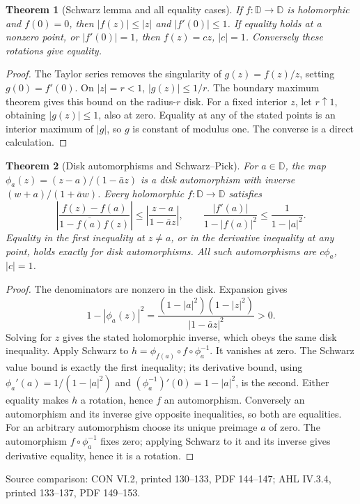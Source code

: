 \documentclass[11pt,a4paper,openany]{book}
\newtheorem{theorem}{Theorem}[chapter]
\theoremstyle{definition}
\theoremstyle{remark}\newtheorem{remark}[theorem]{Remark}
\newcommand{\D}{\mathbb D}\newcommand{\Chat}{\widehat{\mathbb C}}
\newcommand{\family}[1]{}
\newcommand{\source}[1]{\par\begingroup\small\sffamily\color{black!65}Source comparison: #1\par\endgroup}
\begin{document}
\begin{theorem}[Schwarz lemma and all equality cases]\family{D12.06.03}\label{d12:06-03}
If \(f:\D\to\D\) is holomorphic and \(f(0)=0\), then
\(|f(z)|\le|z|\) and \(|f'(0)|\le1\).
If equality holds at a nonzero point, or \(|f'(0)|=1\), then
\(f(z)=cz\), \(|c|=1\). Conversely these rotations give equality.
\end{theorem}
\begin{proof}
The Taylor series removes the singularity of \(g(z)=f(z)/z\), setting
\(g(0)=f'(0)\). On \(|z|=r<1\), \(|g(z)|\le1/r\).
The boundary maximum theorem gives this bound on the radius-\(r\)
disk. For a fixed interior \(z\), let \(r\uparrow1\), obtaining
\(|g(z)|\le1\), also at zero. Equality at any of the stated points
is an interior maximum of \(|g|\), so \(g\) is constant of modulus one.
The converse is a direct calculation.
\end{proof}

\begin{theorem}[Disk automorphisms and Schwarz--Pick]\family{D12.06.04}\label{d12:06-04}
For \(a\in\D\), the map
\(\phi_a(z)=(z-a)/(1-\bar a z)\) is a disk automorphism with inverse
\((w+a)/(1+\bar a w)\).
Every holomorphic \(f:\D\to\D\) satisfies
\[
 \left|\frac{f(z)-f(a)}{1-\overline{f(a)}f(z)}\right|
 \le\left|\frac{z-a}{1-\bar a z}\right|,\qquad
 \frac{|f'(a)|}{1-|f(a)|^2}\le\frac1{1-|a|^2}.
\]
Equality in the first inequality at \(z\ne a\), or in the derivative
inequality at any point, holds exactly for disk automorphisms.
All such automorphisms are \(c\phi_a\), \(|c|=1\).
\end{theorem}
\begin{proof}
The denominators are nonzero in the disk. Expansion gives
\[
 1-|\phi_a(z)|^2=
 \frac{(1-|a|^2)(1-|z|^2)}{|1-\bar a z|^2}>0.
\]
Solving for \(z\) gives the stated holomorphic inverse, which obeys
the same disk inequality. Apply Schwarz to
\(h=\phi_{f(a)}\circ f\circ\phi_a^{-1}\).
It vanishes at zero. The Schwarz value bound is exactly the first
inequality; its derivative bound, using
\(\phi_a'(a)=1/(1-|a|^2)\) and
\((\phi_a^{-1})'(0)=1-|a|^2\), is the second.
Either equality makes \(h\) a rotation, hence \(f\) an automorphism.
Conversely an automorphism and its inverse give opposite inequalities,
so both are equalities.
For an arbitrary automorphism choose its unique preimage \(a\) of zero.
The automorphism \(f\circ\phi_a^{-1}\) fixes zero; applying Schwarz to
it and its inverse gives derivative equality, hence it is a rotation.
\end{proof}
\source{CON VI.2, printed 130--133, PDF 144--147; AHL IV.3.4, printed 133--137, PDF 149--153.}
\end{document}
